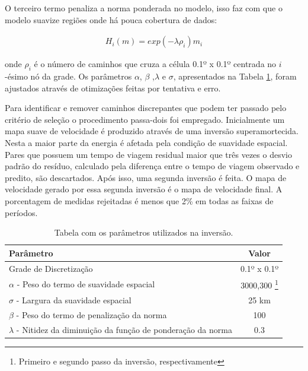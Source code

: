 O terceiro termo penaliza a norma ponderada no modelo, isso faz com que o modelo suavize regiões onde há pouca cobertura de dados:

\begin{eqnarray}
H_{i}(m) = exp(-\lambda \rho _{i})m_{i}
\end{eqnarray}

onde $\rho _{i}$ é o número de caminhos que cruza a célula 0.1º x 0.1º centrada no $i$-ésimo nó da grade. Os parâmetros $\alpha$, $\beta$ ,$\lambda$ e $\sigma$, apresentados na Tabela \ref{tabelaPARAMETROS}, foram ajustados através de otimizações feitas por tentativa e erro.

Para identificar e remover caminhos discrepantes que podem ter passado pelo critério de seleção o procedimento passa-dois foi empregado. Inicialmente um mapa suave de velocidade é produzido através de uma inversão superamortecida. Nesta a maior parte da energia é afetada pela condição de suavidade espacial. Pares que possuem um tempo de viagem residual maior que três vezes o desvio padrão do resíduo, calculado pela diferença entre o tempo de viagem observado e predito,  são descartados. Após isso, uma segunda inversão é feita. O mapa de velocidade gerado por essa segunda inversão é o mapa de velocidade final. A porcentagem de medidas rejeitadas é menos que 2\% em todas as faixas de períodos.

\begin{savenotes}
\begin{table}[!ht]
\begin{center}
\small
\caption{Tabela com os parâmetros utilizados na inversão.}
\begin{tabular}{ l c }
\hline
{\textbf{Parâmetro}} & {\textbf{Valor}}\\
\hline
Grade de Discretização & 0.1º x 0.1º\\
$\alpha$ - Peso do termo de suavidade espacial & 3000,300 \footnote{Primeiro e segundo passo da inversão, respectivamente}
\\
$\sigma$ - Largura da suavidade espacial & 25 km\\
$\beta$ - Peso do termo de penalização da norma & 100\\
$\lambda$ - Nitidez da diminuição da função de ponderação da norma & 0.3\\
\hline
\end{tabular}
\label{tabelaPARAMETROS}
\end{center}
\end{table}
\end{savenotes}

